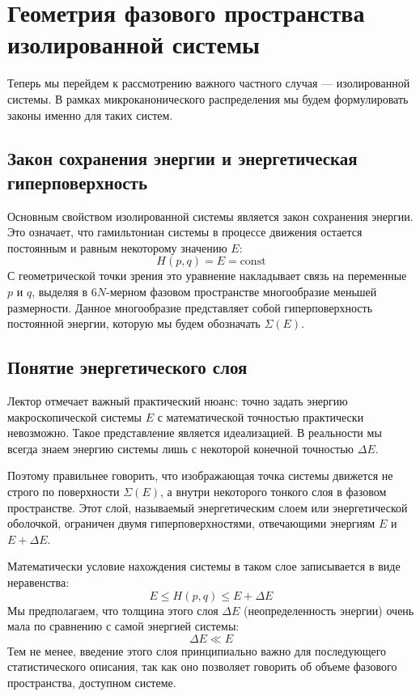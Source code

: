 \documentclass[../general/general]{subfiles}
\begin{document}
\section{Геометрия фазового пространства изолированной системы}

Теперь мы перейдем к рассмотрению важного частного случая — изолированной системы. В рамках микроканонического распределения мы будем формулировать законы именно для таких систем.

\subsection{Закон сохранения энергии и энергетическая гиперповерхность}

Основным свойством изолированной системы является закон сохранения энергии. Это означает, что гамильтониан системы в процессе движения остается постоянным и равным некоторому значению $E$:
\begin{equation}
    H(p, q) = E = \text{const}
\end{equation}
С геометрической точки зрения это уравнение накладывает связь на переменные $p$ и $q$, выделяя в $6N$-мерном фазовом пространстве многообразие меньшей размерности. Данное многообразие представляет собой гиперповерхность постоянной энергии, которую мы будем обозначать $\Sigma(E)$.

\subsection{Понятие энергетического слоя}

Лектор отмечает важный практический нюанс: точно задать энергию макроскопической системы $E$ с математической точностью практически невозможно. Такое представление является идеализацией. В реальности мы всегда знаем энергию системы лишь с некоторой конечной точностью $\Delta E$.

Поэтому правильнее говорить, что изображающая точка системы движется не строго по поверхности $\Sigma(E)$, а внутри некоторого тонкого слоя в фазовом пространстве. Этот слой, называемый энергетическим слоем или энергетической оболочкой, ограничен двумя гиперповерхностями, отвечающими энергиям $E$ и $E + \Delta E$.

Математически условие нахождения системы в таком слое записывается в виде неравенства:
\begin{equation}
    E \le H(p, q) \le E + \Delta E
\end{equation}
Мы предполагаем, что толщина этого слоя $\Delta E$ (неопределенность энергии) очень мала по сравнению с самой энергией системы:
\begin{equation}
    \Delta E \ll E
\end{equation}
Тем не менее, введение этого слоя принципиально важно для последующего статистического описания, так как оно позволяет говорить об объеме фазового пространства, доступном системе.
\end{document}
